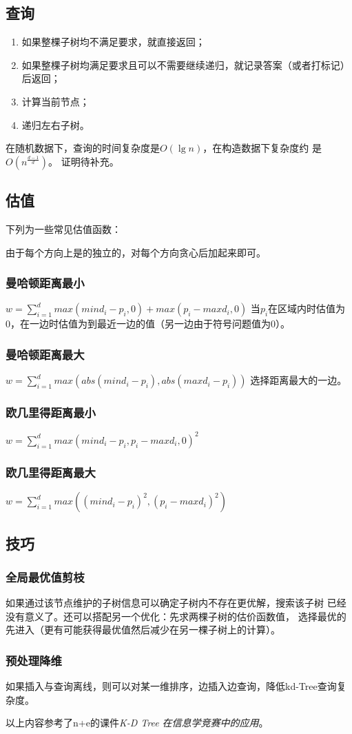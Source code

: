 \subsection{查询}
\begin{enumerate}
	\item 如果整棵子树均不满足要求，就直接返回；
	\item 如果整棵子树均满足要求且可以不需要继续递归，就记录答案（或者打标记）后返回；
	\item 计算当前节点；
	\item 递归左右子树。
\end{enumerate}
在随机数据下，查询的时间复杂度是$O(\lg n)$，在构造数据下复杂度约
是$O(n^\frac{d-1}{d})$。
证明待补充。
\subsection{估值}
下列为一些常见估值函数：

由于每个方向上是的独立的，对每个方向贪心后加起来即可。
\subsubsection{曼哈顿距离最小}
$\displaystyle w=\sum_{i=1}^d{max(mind_i-p_i,0)+max(p_i-maxd_i,0)}$
当$p_i$在区域内时估值为0，在一边时估值为到最近一边的值（另一边由于符号问题值为0）。
\subsubsection{曼哈顿距离最大}
$\displaystyle w=\sum_{i=1}^d{max(abs(mind_i-p_i),abs(maxd_i-p_i))}$
选择距离最大的一边。
\subsubsection{欧几里得距离最小}
$\displaystyle w=\sum_{i=1}^d{max(mind_i-p_i,p_i-maxd_i,0)^2}$
\subsubsection{欧几里得距离最大}
$\displaystyle w=\sum_{i=1}^d{max((mind_i-p_i)^2,(p_i-maxd_i)^2)}$
\subsection{技巧}
\subsubsection{全局最优值剪枝}
如果通过该节点维护的子树信息可以确定子树内不存在更优解，搜索该子树
已经没有意义了。还可以搭配另一个优化：先求两棵子树的估价函数值，
选择最优的先进入（更有可能获得最优值然后减少在另一棵子树上的计算）。
\subsubsection{预处理降维}
如果插入与查询离线，则可以对某一维排序，边插入边查询，降低kd-Tree查询复杂度。

以上内容参考了n+e的课件\emph{K-D Tree 在信息学竞赛中的应用}\cite{kdTree}。
